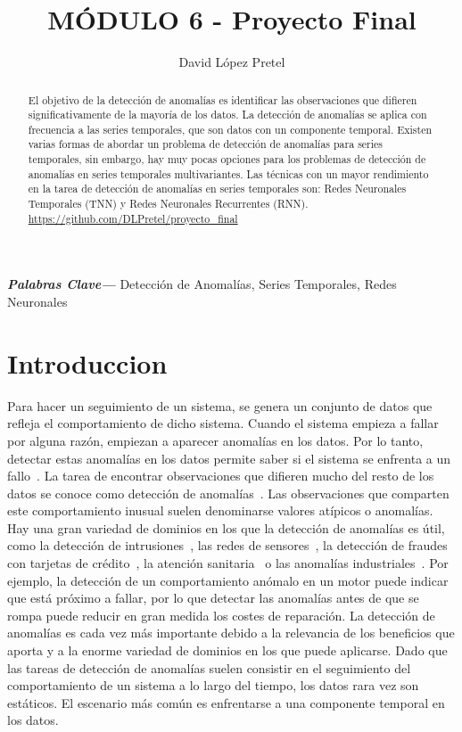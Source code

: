 \documentclass{article}
\providecommand{\keywords}[1]{\textbf{\textit{Palabras Clave---}} #1}
\begin{document}
	\title{MÓDULO 6 - Proyecto Final}
	\author{David López Pretel}
	\maketitle
	\newpage
	\tableofcontents
	\newpage
	
	\begin{abstract}
		El objetivo de la detección de anomalías es identificar las observaciones que difieren significativamente de la mayoría de los datos.
		La detección de anomalías se aplica con frecuencia a las series temporales, que son datos con un componente temporal. Existen varias formas de abordar un problema de detección de anomalías para series temporales, sin embargo, hay muy pocas opciones para los problemas de detección de anomalías en series temporales multivariantes. Las técnicas con un mayor rendimiento en la tarea de detección de anomalías en series temporales son: Redes Neuronales Temporales (TNN) y Redes Neuronales Recurrentes (RNN).\\				\url{https://github.com/DLPretel/proyecto_final}
	\end{abstract}

	\keywords{Detección de Anomalías, Series Temporales, Redes Neuronales}
	
	\section{Introduccion}
	
	Para hacer un seguimiento de un sistema, se genera un conjunto de datos que refleja el comportamiento de dicho sistema. Cuando el sistema empieza a fallar por alguna razón, empiezan a aparecer anomalías en los datos. Por lo tanto, detectar estas anomalías en los datos permite saber si el sistema se enfrenta a un fallo~\cite{chandola2009anomaly, charuOutlier, erhan202164}. La tarea de encontrar observaciones que difieren mucho del resto de los datos se conoce como detección de anomalías~\cite{chandola2009anomaly}. Las observaciones que comparten este comportamiento inusual suelen denominarse valores atípicos o anomalías. 
	Hay una gran variedad de dominios en los que la detección de anomalías es útil, como la detección de intrusiones~\cite{kilincer2021machine}, las redes de sensores~\cite{kraljevski2021machine}, la detección de fraudes con tarjetas de crédito~\cite{forough2021ensemble}, la atención sanitaria~\cite{dwivedi2021novel} o las anomalías industriales~\cite{bayram2021real}.
	Por ejemplo, la detección de un comportamiento anómalo en un motor puede indicar que está próximo a fallar, por lo que detectar las anomalías antes de que se rompa puede reducir en gran medida los costes de reparación. La detección de anomalías es cada vez más importante debido a la relevancia de los beneficios que aporta y a la enorme variedad de dominios en los que puede aplicarse. Dado que las tareas de detección de anomalías suelen consistir en el seguimiento del comportamiento de un sistema a lo largo del tiempo, los datos rara vez son estáticos. El escenario más común es enfrentarse a una componente temporal en los datos.
	
\end{document}

